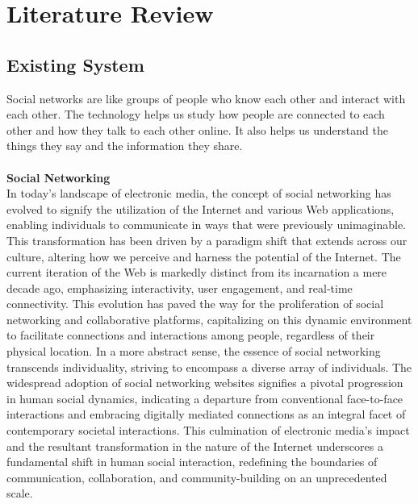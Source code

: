 \section{Literature Review}
\subsection{Existing System}
Social networks are like groups of people who know each other and interact with each other. The technology helps us study how people are connected to each other and how they talk to each other online. It also helps us understand the things they say and the information they share.\cite{korshunov2014social}\\\\

\textbf{Social Networking}\\
In today's landscape of electronic media, the concept of social networking has evolved to signify the utilization of the Internet and various Web applications, enabling individuals to communicate in ways that were previously unimaginable. This transformation has been driven by a paradigm shift that extends across our culture, altering how we perceive and harness the potential of the Internet. The current iteration of the Web is markedly distinct from its incarnation a mere decade ago, emphasizing interactivity, user engagement, and real-time connectivity. This evolution has paved the way for the proliferation of social networking and collaborative platforms, capitalizing on this dynamic environment to facilitate connections and interactions among people, regardless of their physical location. In a more abstract sense, the essence of social networking transcends individuality, striving to encompass a diverse array of individuals. The widespread adoption of social networking websites signifies a pivotal progression in human social dynamics, indicating a departure from conventional face-to-face interactions and embracing digitally mediated connections as an integral facet of contemporary societal interactions. This culmination of electronic media's impact and the resultant transformation in the nature of the Internet underscores a fundamental shift in human social interaction, redefining the boundaries of communication, collaboration, and community-building on an unprecedented scale.
\cite{weaver2008social}\\\\

